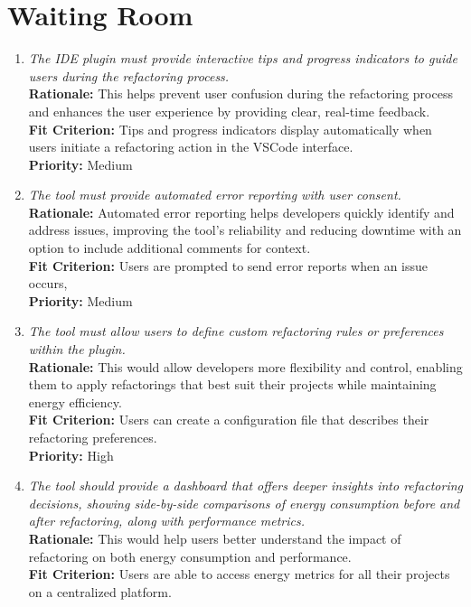 \documentclass[12pt]{article}
\begin{document}
\section{Waiting Room}
\begin{enumerate}[label=WTRM \arabic*., wide=0pt, leftmargin=*]
	\item \emph{The IDE plugin must provide interactive tips and progress indicators to guide users during the refactoring process.}\\
    {\bf Rationale:} This helps prevent user confusion during the refactoring process and enhances the user experience by providing clear, real-time feedback.\\
    {\bf Fit Criterion:} Tips and progress indicators display automatically when users initiate a refactoring action in the VSCode interface.\\
    {\bf Priority:} Medium
  \item \emph{The tool must provide automated error reporting with user consent.}\\
    {\bf Rationale:} Automated error reporting helps developers quickly identify and address issues, improving the tool's reliability and reducing downtime with an option to include additional comments for context.\\
    {\bf Fit Criterion:} Users are prompted to send error reports when an issue occurs, \\
    {\bf Priority:} Medium
  \item \emph{The tool must allow users to define custom refactoring rules or preferences within the plugin.}\\
    {\bf Rationale:} This would allow developers more flexibility and control, enabling them to apply refactorings that best suit their projects while maintaining energy efficiency.\\
    {\bf Fit Criterion:} Users can create a configuration file that describes their refactoring preferences.\\
    {\bf Priority:} High
  \item \emph{The tool should provide a dashboard that offers deeper insights into refactoring decisions, showing side-by-side comparisons of energy consumption before and after refactoring, along with performance metrics.}\\
    {\bf Rationale:} This would help users better understand the impact of refactoring on both energy consumption and performance.\\
    {\bf Fit Criterion:} Users are able to access energy metrics for all their projects on a centralized platform.\\

\end{enumerate}
\end{document}
